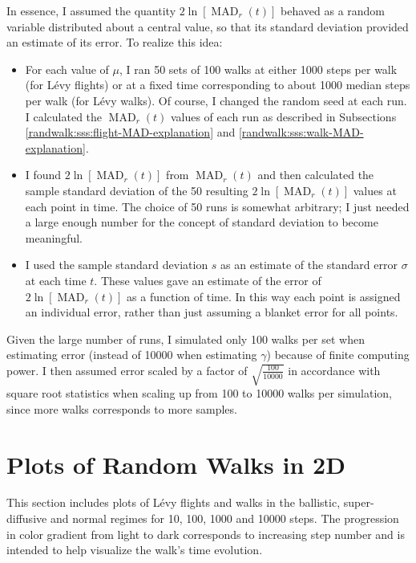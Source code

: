 \documentclass[11pt, a4paper]{article}
\newcommand{\lev}{L\'evy\xspace}
\newcommand{\mad}{\operatorname{MAD}}
\begin{document}
In essence, I assumed the quantity $ 2 \ln[\mad_{r}(t)] $ behaved as a random variable distributed about a central value, so that its standard deviation provided an estimate of its error. To realize this idea:
\begin{itemize}
	\item For each value of $ \mu $, I ran 50 sets of 100 walks at either 1000 steps per walk (for \lev flights) or at a fixed time corresponding to about 1000 median steps per walk (for \lev walks). Of course, I changed the random seed at each run. I calculated the $ \mad_{r}(t) $ values of each run as described in Subsections \ref{randwalk:sss:flight-MAD-explanation} and \ref{randwalk:sss:walk-MAD-explanation}.
	
	\item I found $ 2 \ln[\mad_{r}(t)] $ from $ \mad_{r}(t)  $ and then calculated the sample standard deviation of the 50 resulting $  2 \ln[\mad_{r}(t)] $ values at each point in time. The choice of 50 runs is somewhat arbitrary; I just needed a large enough number for the concept of standard deviation to become meaningful. 
	
	\item I used the sample standard deviation $ s $ as an estimate of the standard error $ \sigma $ at each time $ t $. These values gave an estimate of the error of $  2 \ln[\mad_{r}(t)]  $ as a function of time. In this way each point is assigned an individual error, rather than just assuming a blanket error for all points.
	

\end{itemize}
Given the large number of runs, I simulated only 100 walks per set when estimating error (instead of 10000 when estimating $ \gamma $) because of finite computing power. I then assumed error scaled by a factor of $ \sqrt{\frac{100}{10000}} $ in accordance with square root statistics when scaling up from 100 to 10000 walks per simulation, since more walks corresponds to more samples.


\appendix
\section{Plots of Random Walks in 2D} \label{randwalk:s:2D-walk-plots}
This section includes plots of \lev flights and walks in the ballistic, super-diffusive and normal regimes for 10, 100, 1000 and 10000 steps. The progression in color gradient from light to dark corresponds to increasing step number and is intended to help visualize the walk's time evolution.
\end{document}
